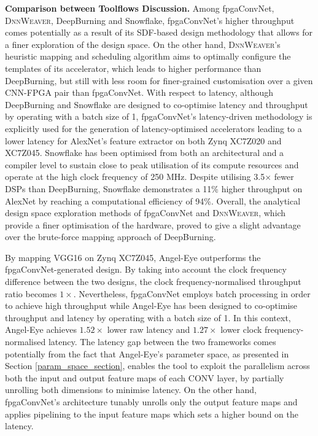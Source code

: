 \documentclass[format=acmsmall, review=false, screen=true]{acmart}
\begin{document}
\textbf{Comparison between Toolflows Discussion.}
Among fpgaConvNet, \textsc{DnnWeaver}, DeepBurning {\color{black}and Snowflake}, fpgaConvNet's higher throughput comes potentially as a result of its SDF-based design methodology that allows for a finer exploration of the design space. On the other hand, \textsc{DnnWeaver}'s heuristic mapping and scheduling algorithm aims to optimally configure the templates of its accelerator, which leads to higher performance than DeepBurning, but still with less room for finer-grained customisation over a given CNN-FPGA pair than fpgaConvNet. With respect to latency, although DeepBurning {\color{black}and Snowflake} are designed to co-optimise latency and throughput by operating with a batch size of 1, fpgaConvNet's latency-driven methodology \cite{Venieris_2017b} is explicitly used for the generation of latency-optimised accelerators leading to a lower latency for AlexNet's feature extractor on both Zynq XC7Z020 and XC7Z045. {\color{black}Snowflake has been optimised from both an architectural and a compiler level to sustain close to peak utilisation of its compute resources and operate at the high clock frequency of 250 MHz. Despite utilising 3.5$\times$ fewer DSPs than DeepBurning, Snowflake demonstrates a 11\% higher throughput on AlexNet by reaching a computational efficiency of 94\%.} Overall, the analytical design space exploration methods of fpgaConvNet and \textsc{DnnWeaver}, which provide a finer optimisation of the hardware, proved to give a slight advantage over the brute-force mapping approach of DeepBurning.

By mapping VGG16 on Zynq XC7Z045, Angel-Eye outperforms the fpgaConvNet-generated design. By taking into account the clock frequency difference between the two designs, the clock frequency-normalised throughput ratio becomes $1\times$. Nevertheless, fpgaConvNet employs batch processing in order to achieve high throughput while Angel-Eye has been designed to co-optimise throughput and latency by operating with a batch size of 1. In this context, Angel-Eye achieves $1.52 \times$ lower raw latency
and $1.27 \times$ lower clock frequency-normalised latency. The latency gap between the two frameworks comes potentially from the fact that Angel-Eye's parameter space, as presented in Section \ref{param_space_section}, enables the tool to exploit the parallelism across both the input and output feature maps of each CONV layer, by partially unrolling both dimensions to minimise latency. On the other hand, fpgaConvNet's architecture tunably unrolls only the output feature maps and applies pipelining to the input feature maps which sets a higher bound on the latency.
\end{document}
